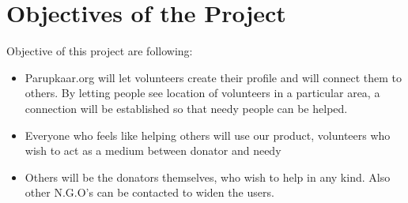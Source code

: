 \section{Objectives of the Project}
Objective of this project are following:
\begin{itemize}
\item Parupkaar.org will let volunteers create their profile and will connect them to others.
By letting people see location of volunteers in a particular area, a connection will be established so that needy people can be helped.

\item Everyone who feels like helping others will use our product, volunteers who wish to act as a medium between donator and needy
\item Others will be the donators themselves, who wish to help in any kind. Also other N.G.O's can be contacted to widen the users.

\end{itemize}
